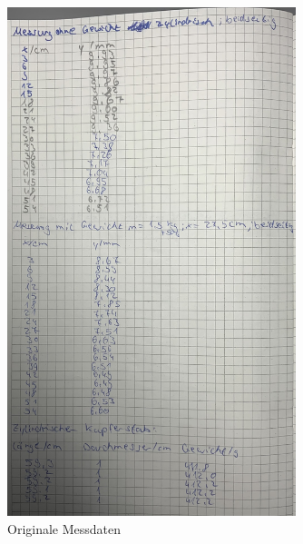 \begin{figure}
    \centering
    \includegraphics[width=0.75\textwidth]{Dateien/Bild3.jpeg}
    \caption{Originale Messdaten}
    \label{fig:daten3}
\end{figure}

